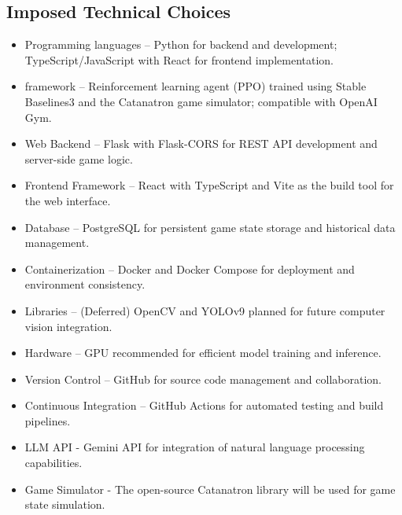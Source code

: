 \documentclass{article}
\begin{document}
\subsection{Imposed Technical Choices}\label{subsec:technicalchoices}
\begin{itemize}
    \item {Programming languages} – Python for backend and \AI{} development; TypeScript/JavaScript with React for frontend implementation.
    \item {\AI{} framework} – Reinforcement learning agent (PPO) trained using Stable Baselines3 and the Catanatron game simulator; compatible with OpenAI Gym.
    \item {Web Backend} – Flask with Flask-CORS for REST API development and server-side game logic.
    \item {Frontend Framework} – React with TypeScript and Vite as the build tool for the web interface.
    \item {Database} – PostgreSQL for persistent game state storage and historical data management.
    \item {Containerization} – Docker and Docker Compose for deployment and environment consistency.
    \item {\CV{} Libraries} – (Deferred) OpenCV and YOLOv9 planned for future computer vision integration.
    \item {Hardware} – GPU recommended for efficient \RL{} model training and inference.
    \item {Version Control} – GitHub for source code management and collaboration.
    \item {Continuous Integration} – GitHub Actions for automated testing and build pipelines.
    \item {LLM API} - Gemini API for integration of natural language processing capabilities.
    \item {Game Simulator} - The open-source Catanatron library will be used for game state simulation.
\end{itemize}
\end{document}
